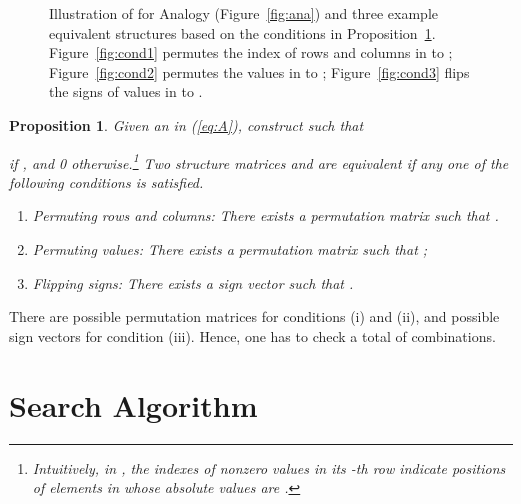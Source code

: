 \documentclass[10pt,journal,compsoc]{IEEEtran}
\newtheorem{prop}{Proposition}
\begin{document}
\begin{figure}[t]
	\centering
	\vspace{-3px}
	\qquad\quad
	
	\qquad\quad
	\vspace{-8px}
	\caption{Illustration of  for Analogy (Figure~\ref{fig:ana}) and
		three example equivalent structures
		based on the conditions in Proposition~\ref{pr:equiv}.
		Figure~\ref{fig:cond1} permutes the index  of rows and columns in  to ;
		Figure~\ref{fig:cond2} permutes the values  in  to ;
		Figure~\ref{fig:cond3} flips the signs of values  in  to .}
	\label{fig:equiv}
	\vspace{-8px}
\end{figure}

\begin{prop} \label{pr:equiv}
Given an  in (\ref{eq:A}), construct
 such
	that
	
	if ,
	and 0
otherwise.\footnote{Intuitively,
in , the indexes of nonzero values 
in its 
	-th
row 
indicate positions of elements in  whose absolute values are 
	.}
Two structure matrices
 and  are equivalent
if any one of the following conditions 
is satisfied.
\begin{enumerate}[label=(\roman*)]
	\item 
	Permuting rows and columns: There
exists a permutation matrix  such that .
\item 
Permuting values:
There exists a permutation matrix  such
that
		;
		\item Flipping signs: There exists a sign vector 
		such that 
.
\end{enumerate}
\end{prop}


There are  possible permutation matrices for conditions
(i) and (ii), and  
possible sign vectors for condition (iii). Hence, one has to check
a total of  combinations.



\section{Search Algorithm}
\label{sec:progred}
\end{document}
